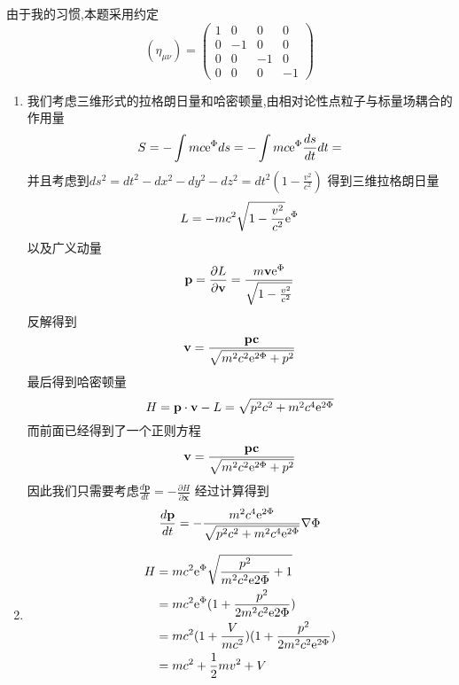 \begin{solution}
由于我的习惯,本题采用约定
$$(\eta_{\mu\nu})=
    \begin{pmatrix}
    1&0&0&0\\
    0&-1&0&0\\
    0&0&-1&0\\
    0&0&0&-1
    \end{pmatrix}$$
    \begin{enumerate}[label=(\arabic*)]
    \item 我们考虑三维形式的拉格朗日量和哈密顿量,由相对论性点粒子与标量场耦合的作用量
    $$S=-\int mc\mathrm e^{\Phi}ds=-\int mc\mathrm e^{\Phi}\frac{ds}{dt}dt=$$
    并且考虑到$ds^2=dt^2-dx^2-dy^2-dz^2=dt^2(1-\frac{v^2}{c^2})$
    得到三维拉格朗日量$$L=-mc^2\sqrt{1-\frac{v^2}{c^2}}\mathrm e^{\Phi}$$
    以及广义动量
    $$\textbf{p}=\frac{\partial L}{\partial \textbf{v}}=\frac{m\textbf{v}\mathrm e^{\Phi}}{\sqrt{1-\frac{v^2}{c^2}}}$$
    反解得到
    $$\textbf{v}=\frac{\textbf{pc}}{\sqrt{m^2c^2\mathrm e^{2\Phi}+p^2}}$$
    最后得到哈密顿量
    $$H=\textbf{p}\cdot{\textbf{v}}-L=\sqrt{p^2c^2+m^2c^4\mathrm e^{2\Phi}}$$
    而前面已经得到了一个正则方程
    $$\textbf{v}=\frac{\textbf{pc}}{\sqrt{m^2c^2\mathrm e^{2\Phi}+p^2}}$$
    因此我们只需要考虑$\frac{d\textbf{p}}{dt}=-\frac{\partial H}{\partial \textbf{x}}$
    经过计算得到
    $$\frac{d\textbf{p}}{dt}=-\frac{m^2c^4\mathrm e^{2\Phi}}{\sqrt{p^2c^2+m^2c^4\mathrm e^{2\Phi}}}\nabla\Phi$$
    \item 
    \begin{align*}
        H&=mc^2\mathrm e^{\Phi}\sqrt{\frac{p^2}{m^2c^2\mathrm e{2\Phi}}+1}\\
         &=mc^2\mathrm e^{\Phi}(1+\frac{p^2}{2m^2c^2\mathrm e{2\Phi}})\\
         &=mc^2(1+\frac{V}{mc^2})(1+\frac{p^2}{2m^2c^2\mathrm e^{2\Phi}})\\
         &=mc^2+\frac12mv^2+V
    \end{align*}
    \end{enumerate}
\end{solution}
